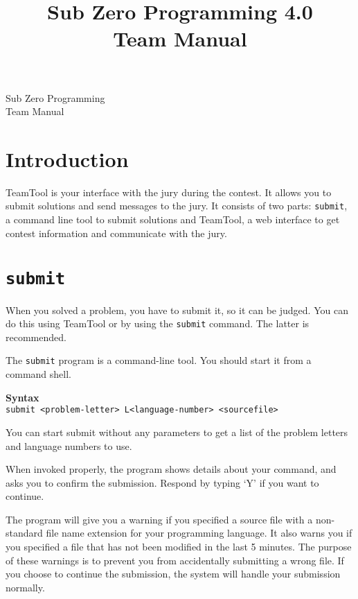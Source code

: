\documentclass[a4paper]{artikel3}
\title{ Sub Zero Programming 4.0 \\ Team Manual }
\newcommand{\cmd}[1]{\texttt{#1}}
\newcommand{\syntax}[1]{\textbf{Syntax}\\\cmd{#1}}
\begin{document}
\begin{titlepage}
\begin{center}

{\Huge Sub Zero Programming} \\

{\Huge Team Manual} \\
\vspace{5cm}


\end{center}
\end{titlepage}


\bigskip
\section{Introduction}

TeamTool is your interface with the jury during the contest. It allows you
to submit solutions and send messages to the jury. It consists of two parts:
\cmd{submit}, a command line tool to submit solutions and TeamTool, a web
interface to get contest information and communicate with the jury.

\section{\cmd{submit}}

\label{sec:submit}

When you solved a problem, you have to submit it, so it can be judged. You
can do this using TeamTool or by using the \cmd{submit} command. The latter
is recommended.

The \cmd{submit} program is a command-line tool. You should start it from a
command shell.

\syntax{submit <problem-letter> L<language-number> <sourcefile>}

You can start submit without any parameters to get a list of the problem
letters and language numbers to use.

When invoked properly, the program shows details about your command, and
asks you to confirm the submission. Respond by typing `Y' if you want to
continue.

The program will give you a warning if you specified a source file with a
non-standard file name extension for your programming language. It also
warns you if you specified a file that has not been modified in the last 5
minutes. The purpose of these warnings is to prevent you from accidentally
submitting a wrong file. If you choose to continue the submission, the
system will handle your submission normally.
\end{document}
